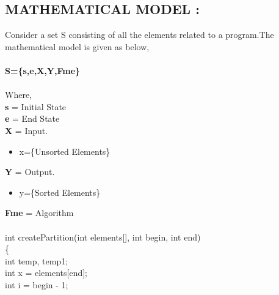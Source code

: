 \documentclass{article}
\begin{document}
	\subsection{MATHEMATICAL MODEL : }
	Consider a set S consisting of all the elements related to a program.The
	mathematical model is given as below,\\\\
	\textbf{S=\{s,e,X,Y,Fme\} }\\\\
	Where,\\
	\textbf{s} = Initial State\\
	\textbf{e} = End State\\
	\textbf{X} = Input. \\
	\begin{itemize}
		\item  x=\{Unsorted Elements\} 
	\end{itemize}
	\textbf{Y} = Output. \\
	\begin{itemize}
		\item y=\{Sorted Elements\} 
	\end{itemize}
	\textbf{Fme} = Algorithm \\\\
	int createPartition(int elements[], int begin, int end) \\
	\{\\
	int temp, temp1;\\
	int x = elements[end];\\
	int i = begin - 1;\\
\end{document}
